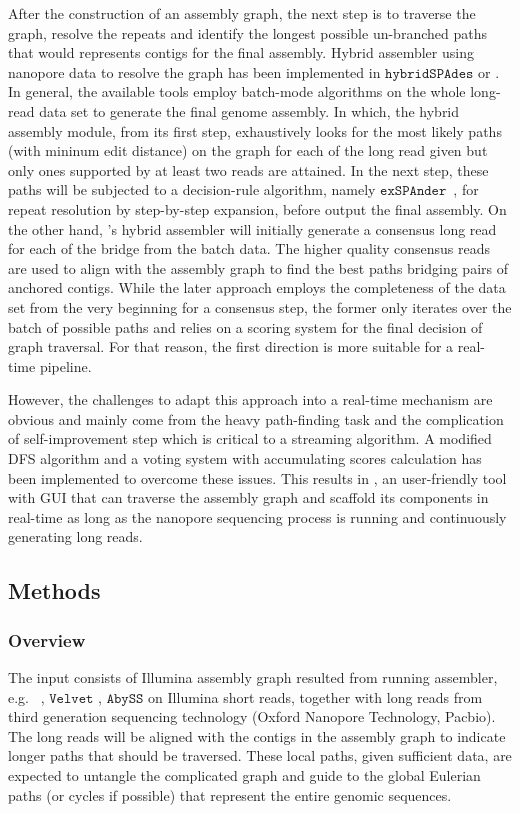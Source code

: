 After the construction of an assembly graph, the next step is to traverse the graph, resolve the repeats and identify the longest possible un-branched paths that would represents contigs for the final assembly.
Hybrid assembler using nanopore data to resolve the graph has been implemented in $\mathtt{hybridSPAdes}$ \cite{AntipovKM2015} or \unicycler{} \cite{Wick2017unicycler}. 
In general, the available tools employ batch-mode algorithms on the whole long-read data set to generate the final genome assembly. 
In which, the \spades{} hybrid assembly module, from its first step, exhaustively looks for the most likely paths (with mininum edit distance) on the graph for each of the long read given but only ones supported by at least two reads are attained. In the next step, these paths will be subjected to a decision-rule algorithm, namely $\mathtt{exSPAnder}$~\cite{Prjibelski2014}, for repeat resolution by step-by-step expansion, before output the final assembly.
On the other hand, \unicycler{}'s hybrid assembler will initially generate a consensus long read for each of the bridge from the batch data. 
The higher quality consensus reads are used to align with the assembly graph to find the best paths bridging pairs of anchored contigs.
While the later approach employs the completeness of the data  set from the very beginning for a consensus step, the former only iterates over the batch of possible paths and relies on a scoring system for the final decision of graph traversal. For that reason, the first direction is more suitable for a real-time pipeline.
    
However, the challenges to adapt this approach into a real-time mechanism are obvious and mainly come from the heavy path-finding task and the complication of self-improvement step which is critical to a streaming algorithm. 
A modified DFS algorithm and a voting system with accumulating scores calculation has been implemented to overcome these issues.
This results in \npgraph{}, an user-friendly tool with GUI that can traverse the assembly graph and scaffold its components in real-time as long as the nanopore sequencing process is running and continuously generating long reads.  


\subsection{Methods}
\subsubsection{Overview}
The input consists of Illumina assembly graph resulted from running assembler, e.g. \spades{}~\cite{BankevichNA2012}, $\mathtt{Velvet}$ \cite{Zerbino2008}, $\mathtt{AbySS}$ \cite{Simpson2009} on Illumina short reads, together with long reads from third generation sequencing technology (Oxford Nanopore Technology, Pacbio).
The long reads will be aligned with the contigs in the assembly graph to indicate longer paths that should be traversed. These local paths, given sufficient data, are expected to untangle the complicated graph and guide to the global Eulerian paths (or cycles if possible) that represent the entire genomic sequences. 

